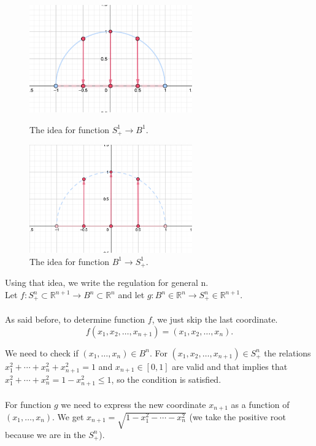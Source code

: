 \documentclass[a4paper,11pt]{article}
\begin{document}
\begin{figure}[ht]
    \begin{minipage}{0.5\textwidth}
         \centering
         \includegraphics[width=70mm]{XY_2.png}
         \caption{The idea for function $S_{+}^{1} \to B^1$.}
    \end{minipage}\hfill
    \begin{minipage}{0.5\textwidth}
         \centering
         \includegraphics[width=70mm]{YX_2.png}
         \caption{The idea for function $B^1 \to S_{+}^{1}$.}
    \end{minipage}\hfill
\end{figure}
\noindent
Using that idea, we write the regulation for general n.
\\
Let $f: S_{+}^{n} \subset \mathbb{R}^{n + 1} \to B^n \subset \mathbb{R}^n$ and let $g: B^n \in \mathbb{R}^n \to S_{+}^{n} \in \mathbb{R}^{n + 1}$. 
\\
\\
As said before, to determine function $f$, we just skip the last coordinate.
$$ f(x_1, x_2, \ldots, x_{n + 1}) = (x_1, x_2, \ldots, x_n). $$

\noindent
We need to check if $(x_1, \ldots, x_n) \in B^n$. For $(x_1, x_2, \ldots, x_{n + 1}) \in S_{+}^{n}$ the relations $x_1^2 + \cdots + x_n^2 + x_{n + 1}^2 = 1$ and $x_{n+1} \in [0,1]$ are valid and that implies that $x_1^2 + \cdots + x_n^2 = 1 - x_{n+1}^2 \leq 1$, so the condition is satisfied.
\\
\\
For function $g$ we need to express the new coordinate $x_{n + 1}$ as a function of $(x_1, \ldots, x_n)$.
We get $x_{n + 1} = \sqrt{ 1 - x_1^2 - \cdots - x_n^2}$ (we take the positive root because we are in the $S_{+}^{n}$). 
\end{document}

